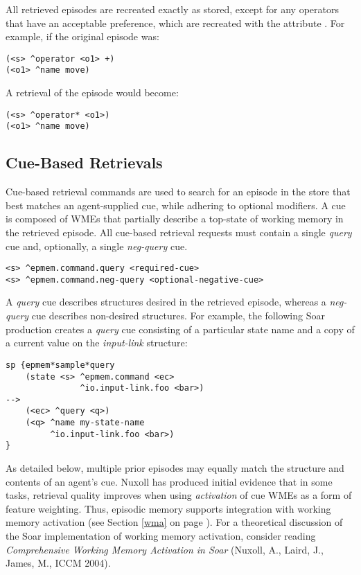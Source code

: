 All retrieved episodes are recreated exactly as stored, except for any operators that have an acceptable preference, which are recreated with the attribute .
For example, if the original episode was:

\begin{verbatim}
(<s> ^operator <o1> +)
(<o1> ^name move)
\end{verbatim}

A retrieval of the episode would become:

\begin{verbatim}
(<s> ^operator* <o1>)
(<o1> ^name move)
\end{verbatim}

\subsection{Cue-Based Retrievals}
Cue-based retrieval commands are used to search for an episode in the store that best matches an agent-supplied cue, while adhering to optional modifiers.  
A cue is composed of WMEs that partially describe a top-state of working memory in the retrieved episode.  
All cue-based retrieval requests must contain a single \emph{query} cue and, optionally, a single \emph{neg-query} cue.  

\begin{verbatim}
<s> ^epmem.command.query <required-cue>
<s> ^epmem.command.neg-query <optional-negative-cue>
\end{verbatim}

A \emph{query} cue describes structures desired in the retrieved episode, whereas a \emph{neg-query} cue describes non-desired structures.  
For example, the following Soar production creates a \emph{query} cue consisting of a particular state name and a copy of a current value on the \emph{input-link} structure:

\begin{verbatim}
sp {epmem*sample*query
    (state <s> ^epmem.command <ec>
               ^io.input-link.foo <bar>)
-->
    (<ec> ^query <q>)
    (<q> ^name my-state-name
         ^io.input-link.foo <bar>)
}
\end{verbatim}

As detailed below, multiple prior episodes may equally match the structure and contents of an agent's cue. 
Nuxoll has produced initial evidence that in some tasks, retrieval quality improves when using \emph{activation} of cue WMEs as a form of feature weighting.  
Thus, episodic memory supports integration with working memory activation (see Section \ref{wma} on page \pageref{wma}).  
For a theoretical discussion of the Soar implementation of working memory activation, consider reading \emph{Comprehensive Working Memory Activation in Soar} (Nuxoll, A., Laird, J., James, M., ICCM 2004).

